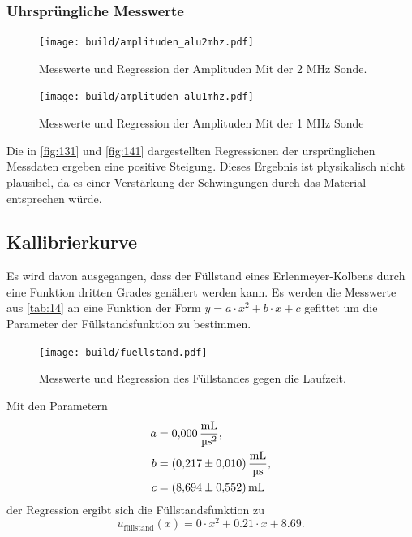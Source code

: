 \subsubsection{Uhrsprüngliche Messwerte}
\begin{figure}[H]
    \centering
    \caption{Messwerte und Regression der Amplituden Mit der 2 $\unit{\mega\hertz}$ Sonde.}
    \label{fig:131}
    \texttt{[image: build/amplituden\_alu2mhz.pdf]}
\end{figure}
\begin{figure}[H]
    \centering
    \caption{Messwerte und Regression der Amplituden Mit der 1 $\unit{\mega\hertz}$ Sonde }
    \label{fig:141}
    \texttt{[image: build/amplituden\_alu1mhz.pdf]}
\end{figure}
\noindent Die in \autoref{fig:131} und \autoref{fig:141} dargestellten Regressionen
der ursprünglichen Messdaten ergeben eine positive Steigung. Dieses Ergebnis
ist physikalisch nicht plausibel, da es einer Verstärkung der Schwingungen
durch das Material entsprechen würde.

\subsection{Kallibrierkurve}
Es wird davon ausgegangen, dass der Füllstand eines Erlenmeyer-Kolbens durch
eine Funktion dritten Grades genähert werden kann. Es werden die Messwerte 
aus \autoref{tab:14} an eine Funktion der Form $y = a \cdot x^2 + b \cdot x + c $ gefittet 
um die Parameter der Füllstandsfunktion zu bestimmen. 
\begin{figure}[H]
    \centering
    \caption{Messwerte und Regression des Füllstandes gegen die Laufzeit.}
    \label{fig:15}
    \texttt{[image: build/fuellstand.pdf]}
\end{figure}

\noindent Mit den Parametern 
\begin{align}
    a &= \qty{0.000(0.000)}{\frac{\milli\liter}{\micro\second^2}}, \\
    b &= \qty{0.217(0.010)}{\frac{\milli\liter}{\micro\second}}, \\
    c &= \qty{8.694(0.552)}{\milli\liter}
\end{align}
der Regression ergibt sich die Füllstandsfunktion zu 
\begin{equation}
    u_\text{füllstand}(x) = 0 \cdot x^2 + 0.21 \cdot x + 8.69.
\end{equation}

